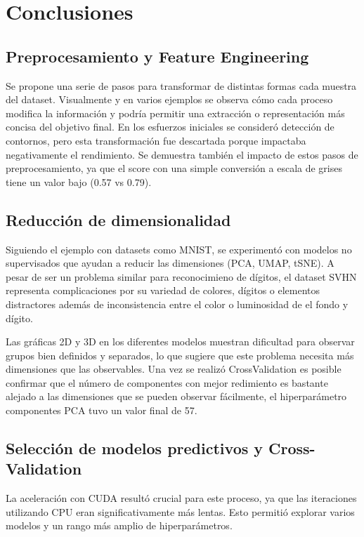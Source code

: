 \documentclass[journal]{IEEEtran}
\begin{document}
\section{Conclusiones}

\subsection{Preprocesamiento y Feature Engineering}
Se propone una serie de pasos para transformar de distintas formas cada muestra del dataset. Visualmente y en varios ejemplos se observa cómo cada proceso modifica la información y podría permitir una extracción o representación más concisa del objetivo final. En los esfuerzos iniciales se consideró detección de contornos, pero esta transformación fue descartada porque impactaba negativamente el rendimiento. Se demuestra también el impacto de estos pasos de preprocesamiento, ya que el score con una simple conversión a escala de grises tiene un valor bajo (0.57 vs 0.79).

\subsection{Reducción de dimensionalidad}
Siguiendo el ejemplo con datasets como MNIST, se experimentó con modelos no supervisados que ayudan a reducir las dimensiones (PCA, UMAP, tSNE). A pesar de ser un problema similar para reconocimieno de dígitos, el dataset SVHN representa complicaciones por su variedad de colores, dígitos o elementos distractores además de inconsistencia entre el color o luminosidad de el fondo y dígito.

Las gráficas 2D y 3D en los diferentes modelos muestran dificultad para observar grupos bien definidos y separados, lo que sugiere que este problema necesita más dimensiones que las observables. Una vez se realizó CrossValidation es posible confirmar que el número de componentes con mejor redimiento es bastante alejado a las dimensiones que se pueden observar fácilmente, el hiperparámetro componentes PCA tuvo un valor final de 57.

\subsection{Selección de modelos predictivos y Cross-Validation}
La aceleración con CUDA resultó crucial para este proceso, ya que las iteraciones utilizando CPU eran significativamente más lentas. Esto permitió explorar varios modelos y un rango más amplio de hiperparámetros.
\end{document}
